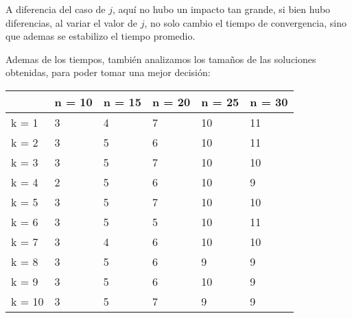 A diferencia del caso de $j$, aquí no hubo un impacto tan grande, si bien hubo diferencias, al variar el valor de $j$, no solo cambio el tiempo de convergencia, sino que ademas se estabilizo el tiempo promedio.

Ademas de los tiempos, también analizamos los tamaños de las soluciones obtenidas, para poder tomar una mejor decisión:

\begin{table}[H]
\centering
\label{my-label}
\begin{tabular}{|l|lllll|}
\hline
       & \multicolumn{1}{l|}{n = 10} & \multicolumn{1}{l|}{n = 15} & \multicolumn{1}{l|}{n = 20} & \multicolumn{1}{l|}{n = 25} & n = 30 \\ \hline
k = 1  & 3                           & 4                           & 7                           & 10                          & 11     \\ \cline{1-1}
k = 2  & 3                           & 5                           & 6                           & 10                          & 11     \\ \cline{1-1}
k = 3  & 3                           & 5                           & 7                           & 10                          & 10     \\ \cline{1-1}
k = 4  & 2                           & 5                           & 6                           & 10                          & 9      \\ \cline{1-1}
k = 5  & 3                           & 5                           & 7                           & 10                          & 10     \\ \cline{1-1}
k = 6  & 3                           & 5                           & 5                           & 10                          & 11     \\ \cline{1-1}
k = 7  & 3                           & 4                           & 6                           & 10                          & 10     \\ \cline{1-1}
k = 8  & 3                           & 5                           & 6                           & 9                           & 9      \\ \cline{1-1}
k = 9  & 3                           & 5                           & 6                           & 10                          & 9      \\ \cline{1-1}
k = 10 & 3                           & 5                           & 7                           & 9                           & 9      \\ \cline{1-1}

\end{tabular}
\end{table}
